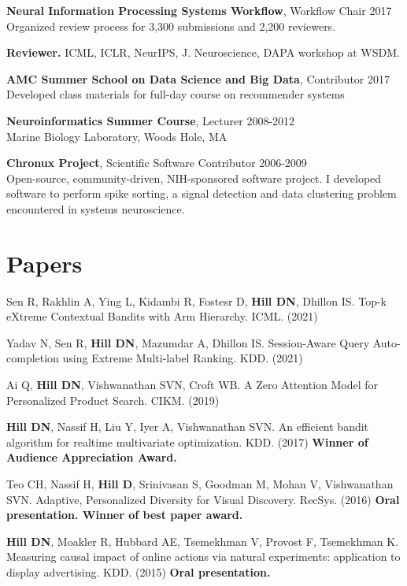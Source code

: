 \documentclass[line,11pt]{res}
\begin{document}
\begin{resume}
	\textbf{Neural Information Processing Systems Workflow}, Workflow Chair 2017 \\
    	Organized review process for 3,300 submissions and 2,200 reviewers.
    
  \textbf{Reviewer.} ICML, ICLR, NeurIPS, J. Neuroscience, DAPA workshop at WSDM.

	\textbf{AMC Summer School on Data Science and Big Data}, Contributor 2017 \\
         Developed class materials for full-day course on recommender systems
         
	\textbf{Neuroinformatics Summer Course}, Lecturer 2008-2012 \\
    Marine Biology Laboratory, Woods Hole, MA
    
    	\textbf{Chronux Project}, Scientific Software Contributor 2006-2009 \\
    	Open-source, community-driven, NIH-sponsored software project. I developed software to perform spike sorting, a signal detection and data clustering problem encountered in systems neuroscience. 
    
\section{Papers}
\vspace{0.1in}
Sen R, Rakhlin A, Ying L, Kidambi R, Fostesr D, \textbf{Hill DN}, Dhillon IS. Top-k eXtreme Contextual Bandits with Arm Hierarchy.  ICML. (2021)

Yadav N, Sen R, \textbf{Hill DN}, Mazumdar A, Dhillon IS. Session-Aware Query Auto-completion using Extreme Multi-label Ranking.  KDD. (2021)

Ai Q, \textbf{Hill DN}, Vishwanathan SVN, Croft WB. A Zero Attention Model for Personalized Product Search. CIKM. (2019)

\textbf{Hill DN}, Nassif H, Liu Y, Iyer A, Vishwanathan SVN. An efficient bandit algorithm for realtime multivariate optimization. KDD. (2017) \textbf{Winner of Audience Appreciation Award.}

Teo CH, Nassif H, \textbf{Hill D}, Srinivasan S, Goodman M, Mohan V, Vishwanathan SVN. Adaptive, Personalized Diversity for Visual Discovery. RecSys. (2016) \textbf{Oral presentation. Winner of best paper award.}

\textbf{Hill DN}, Moakler R, Hubbard AE, Tsemekhman V, Provost F, Tsemekhman K.  Measuring causal impact of online actions via natural experiments: application to display advertising. KDD. (2015) \textbf{Oral presentation.}


\end{resume}
\end{document}
